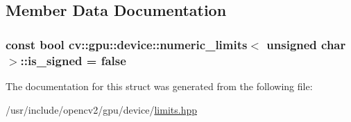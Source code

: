 \subsection{Member Data Documentation}
\hypertarget{structcv_1_1gpu_1_1device_1_1numeric__limits_3_01unsigned_01char_01_4_a9a0560ce42cf99cc109676631687103f}{
\subsubsection[{is\-\_\-signed}]{\setlength{\rightskip}{0pt plus 5cm}const bool {\bf cv\-::gpu\-::device\-::numeric\-\_\-limits}$<$ unsigned char $>$\-::is\-\_\-signed = {\bf false}\hspace{0.3cm}{\ttfamily [static]}}}\label{structcv_1_1gpu_1_1device_1_1numeric__limits_3_01unsigned_01char_01_4_a9a0560ce42cf99cc109676631687103f}


The documentation for this struct was generated from the following file\-:\begin{DoxyCompactItemize}
\item 
/usr/include/opencv2/gpu/device/\hyperlink{limits_8hpp}{limits.\-hpp}\end{DoxyCompactItemize}

